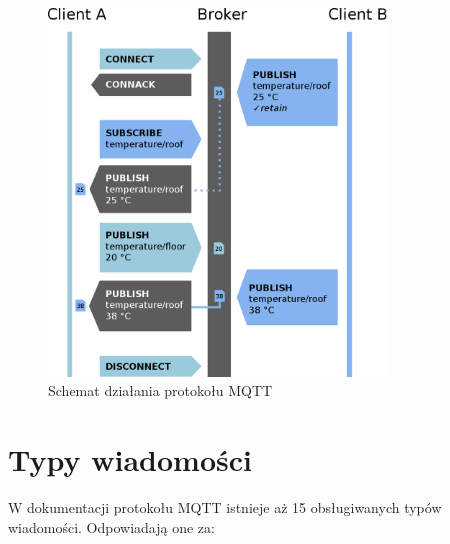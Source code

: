         \begin{figure}[ht]
            \centering
            \includegraphics[width=0.8\textwidth]{img/mqtt_schematic.png}
            \caption{Schemat działania protokołu MQTT \cite{mqtt_schematic_fig}}
            \label{fig:mqtt_schematic}
        \end{figure}
         
        
    \section{Typy wiadomości}
        W dokumentacji protokołu MQTT \cite{mqtt} istnieje aż 15 obsługiwanych typów wiadomości. Odpowiadają one za:
        
